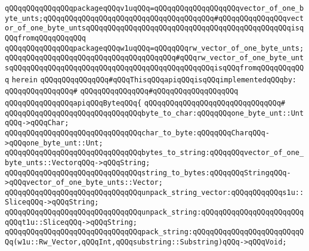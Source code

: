 \verb|qQQqqQQqqQQqqQQqpackageqQQqv1uqQQq=qQQqqQQqqQQqqQQqqQQqvector_of_one_byte_unts;qQQqqQQqqQQqqQQqqQQqqQQqqQQqqQQqqQQqqQQq#qQQqqQQqqQQqqQQqvector_of_one_byte_untsqQQqqQQqqQQqqQQqqQQqqQQqqQQqqQQqqQQqqQQqqQQqqQQqisqQQqfromqQQqqQQqqQQq|\newline
\verb|qQQqqQQqqQQqqQQqpackageqQQqw1uqQQq=qQQqqQQqrw_vector_of_one_byte_unts;qQQqqQQqqQQqqQQqqQQqqQQqqQQqqQQqqQQqqQQq#qQQqrw_vector_of_one_byte_untsqQQqqQQqqQQqqQQqqQQqqQQqqQQqqQQqqQQqqQQqqQQqqQQqisqQQqfromqQQqqQQqqQQq|\newline
\verb|herein|\newline
\newline
\verb|qQQqqQQqqQQqqQQq#qQQqThisqQQqapiqQQqisqQQqimplementedqQQqby:|\newline
\verb|qQQqqQQqqQQqqQQq#|\newline
\verb|qQQqqQQqqQQqqQQq#qQQqqQQqqQQqqQQqqQQq|\newline
\newline
\verb|qQQqqQQqqQQqqQQqapiqQQqByteqQQq{|\newline
\verb|qQQqqQQqqQQqqQQqqQQqqQQqqQQqqQQq#|\newline
\verb|qQQqqQQqqQQqqQQqqQQqqQQqqQQqqQQqbyte_to_char:qQQqqQQqone_byte_unt::UntqQQq->qQQqChar;|\newline
\verb|qQQqqQQqqQQqqQQqqQQqqQQqqQQqqQQqchar_to_byte:qQQqqQQqCharqQQq->qQQqone_byte_unt::Unt;|\newline
\newline
\verb|qQQqqQQqqQQqqQQqqQQqqQQqqQQqqQQqbytes_to_string:qQQqqQQqvector_of_one_byte_unts::VectorqQQq->qQQqString;|\newline
\verb|qQQqqQQqqQQqqQQqqQQqqQQqqQQqqQQqstring_to_bytes:qQQqqQQqStringqQQq->qQQqvector_of_one_byte_unts::Vector;|\newline
\newline
\verb|qQQqqQQqqQQqqQQqqQQqqQQqqQQqqQQqunpack_string_vector:qQQqqQQqqQQqs1u::SliceqQQq->qQQqString;|\newline
\verb|qQQqqQQqqQQqqQQqqQQqqQQqqQQqqQQqunpack_string:qQQqqQQqqQQqqQQqqQQqqQQqqQQqt1u::SliceqQQq->qQQqString;|\newline
\verb|qQQqqQQqqQQqqQQqqQQqqQQqqQQqqQQqpack_string:qQQqqQQqqQQqqQQqqQQqqQQqqQQq(w1u::Rw_Vector,qQQqInt,qQQqsubstring::Substring)qQQq->qQQqVoid;|\newline
